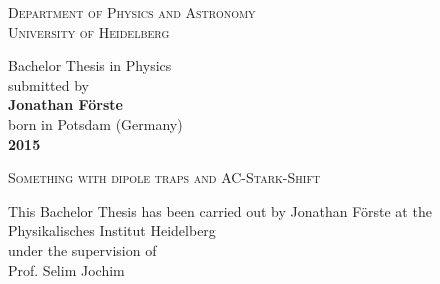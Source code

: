 \pagestyle{empty}

\begin{titlepage}
\begin{center}
 
\Large\textsc{Department of Physics and Astronomy\\
University of Heidelberg}

\vspace{15.5cm}

\normalsize
Bachelor Thesis in Physics\\
submitted by\\
\vspace{0.5cm}
\Large\textbf{Jonathan Förste}\\
\normalsize
\vspace{0.5cm}
born in Potsdam (Germany)\\
\vspace{0.5cm}
\Large\textbf{2015}
\normalsize

\newpage




\Large\textsc{Something with dipole traps and AC-Stark-Shift}

\vspace{18cm}

\normalsize
This Bachelor Thesis has been carried out by Jonathan Förste at the\\
Physikalisches Institut Heidelberg\\
under the supervision of\\
Prof. Selim Jochim

\vfill
\end{center}

\end{titlepage}

\pagestyle{headings}
